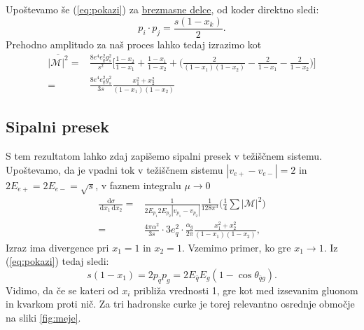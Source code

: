 \documentclass[11pt]{article}
\newcommand{\dd}{\,\mathrm{d}}
\begin{document}
Upoštevamo še (\ref*{eq:pokazi}) za \underline{brezmasne delce}, od koder direktno sledi:
\begin{equation}
       p_i \cdot p_j = \frac{s (1 - x_k)}{2}.
\end{equation}
Prehodno amplitudo za naš proces lahko tedaj izrazimo kot
\begin{equation}
       \begin{split}
       \overline{| \mathcal{M} |^2} =& \frac{8 e^4 e_q^2 g_s^2}{s^2} 
       \bigg [
              \frac{1-x_2}{1-x_1} + \frac{1-x_1}{1-x_2} + \Big (\frac{2}{(1-x_1)(1-x_2)} - \frac{2}{1-x_1} - \frac{2}{1-x_2} \Big)
       \bigg] \\
       =& \frac{8 e^4 e_q^2 g_s^2}{3 s} \frac{x_1^2 + x_2^2}{(1-x_1)(1-x_2)}
       \end{split}
\end{equation}








\subsection{Sipalni presek}
S tem rezultatom lahko zdaj zapišemo sipalni presek v težiščnem sistemu.
Upoštevamo, da je vpadni tok v težiščnem sistemu $|v_{e+} - v_{e-}| = 2$ in $2E_{e+} = 2E_{e-} = \sqrt{s}$,
v faznem integralu $\mu \rightarrow 0$
\begin{equation}
       \begin{split}
              \frac{\dd \sigma}{\dd x_1 \dd x_2} =& \frac{1}{2E_{p_1}2E_{p_2} |v_{p_1} - v_{p_2}|}
              \frac{1}{128 \pi^3} \Big ( \frac{1}{4}\sum | \mathcal{M}|^2 \Big)
              \\
              =& \frac{4 \pi \alpha^2}{3s} \cdot 3 e_q^2 \cdot \frac{\alpha_g}{2 \pi}
              \frac{x_1^2 + x_2^2}{(1-x_1)(1-x_2)},
       \end{split}
\end{equation}
Izraz ima divergence pri $x_1 =1$ in $x_2 =1$.
Vzemimo primer, ko gre $x_1 \rightarrow 1$.
Iz (\ref*{eq:pokazi}) tedaj sledi:
\begin{equation}
       s(1-x_1) = 2 p_{\bar{q}} p_g = 2 E_{\bar{q}} E_g (1-\cos \theta_{\bar{q} g}).
\end{equation}
Vidimo, da če se kateri od $x_i$ približa vrednosti 1, gre kot med izsevanim gluonom in kvarkom proti nič.
Za tri hadronske curke je torej relevantno osrednje območje na sliki \ref{fig:meje}.
\end{document}
